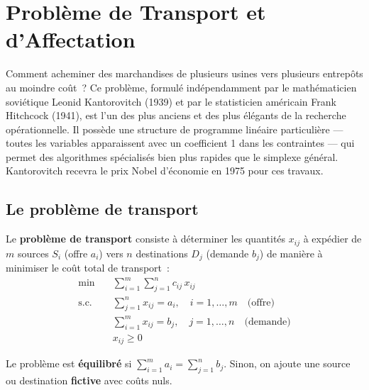 \chapter{Probl\`eme de Transport et d'Affectation}
\label{ch:transport}

Comment acheminer des marchandises de plusieurs usines vers plusieurs entrep\^ots au moindre co\^ut~? Ce probl\`eme, formul\'e ind\'ependamment par le math\'ematicien sovi\'etique Leonid Kantorovitch (1939) et par le statisticien am\'ericain Frank Hitchcock (1941), est l'un des plus anciens et des plus \'el\'egants de la recherche op\'erationnelle. Il poss\`ede une structure de programme lin\'eaire particuli\`ere --- toutes les variables apparaissent avec un coefficient 1 dans les contraintes --- qui permet des algorithmes sp\'ecialis\'es bien plus rapides que le simplexe g\'en\'eral. Kantorovitch recevra le prix Nobel d'\'economie en 1975 pour ces travaux.

\section{Le probl\`eme de transport}

\begin{definition}
Le \textbf{probl\`eme de transport} consiste \`a d\'eterminer les quantit\'es
$x_{ij}$ \`a exp\'edier de $m$ sources $S_i$ (offre $a_i$) vers $n$
destinations $D_j$ (demande $b_j$) de mani\`ere \`a minimiser le co\^ut total
de transport~:
\[
\begin{aligned}
  \min \quad & \sum_{i=1}^{m}\sum_{j=1}^{n} c_{ij}\, x_{ij} \\
  \text{s.c.} \quad
    & \sum_{j=1}^{n} x_{ij} = a_i, \quad i = 1, \ldots, m
      \quad \text{(offre)} \\
    & \sum_{i=1}^{m} x_{ij} = b_j, \quad j = 1, \ldots, n
      \quad \text{(demande)} \\
    & x_{ij} \ge 0
\end{aligned}
\]
\end{definition}

\begin{definition}
Le probl\`eme est \textbf{\'equilibr\'e} si $\sum_{i=1}^m a_i = \sum_{j=1}^n b_j$.
Sinon, on ajoute une source ou destination \textbf{fictive} avec co\^uts nuls.
\end{definition}

